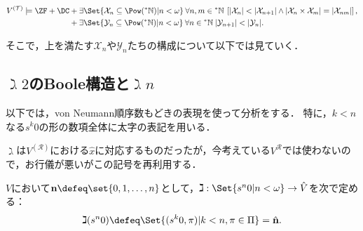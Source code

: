 \documentclass[realisability.tex]{subfiles}
\begin{document}
\begin{theorem}[Krivine]\label{thm:patho-sets-of-reals}
 \[
  V^{(\mathcal{T})}
   \models \ZF + \DC
    \begin{aligned}[t]
     &+\exists \Set{ \mathcal{X}_n \subseteq \Pow(\NN) | n < \omega } \:
     \forall n, m \in \NN \:
    \left[|\mathcal{X}_{n}| < |\mathcal{X}_{n+1}| \land |\mathcal{X}_n \times \mathcal{X}_m| = |\mathcal{X}_{nm}|\right],\\
     &+ \exists \Set{ \mathcal{Y}_n \subseteq \Pow(\NN) | n <\omega} \: \forall n \in\NN \:
       |\mathcal{Y}_{n+1}| < |\mathcal{Y}_n|.
    \end{aligned}
 \]
\end{theorem}

そこで，上を満たす$\mathcal{X}_n$や$\mathcal{Y}_n$たちの構成について以下では見ていく．

\subsection{$\gimel 2$のBoole構造と$\gimel n$}
以下では，von Neumann順序数もどきの表現を使って分析をする．
特に，$k < n$なる$s^k 0$の形の数項全体に太字の表記を用いる．

$\gimel$は$V^{(\mathcal{R})}$における$\hat{x}$に対応するものだったが，今考えている$V^{\mathcal{R}}$では使わないので，お行儀が悪いがこの記号を再利用する．
\begin{notation}
 $V$において$\mathbf{n} \defeq \set{0, 1, \dots, n}$として，$\gimel : \Set{ s^n 0 | n < \omega } \to \hat{V}$を次で定める：
 \[
  \gimel(s^n 0) \defeq \Set{ (s^k 0, \pi) | k < n, \pi \in \Pi } = \hat{\mathbf{n}}.
 \]
\end{notation}
\end{document}
